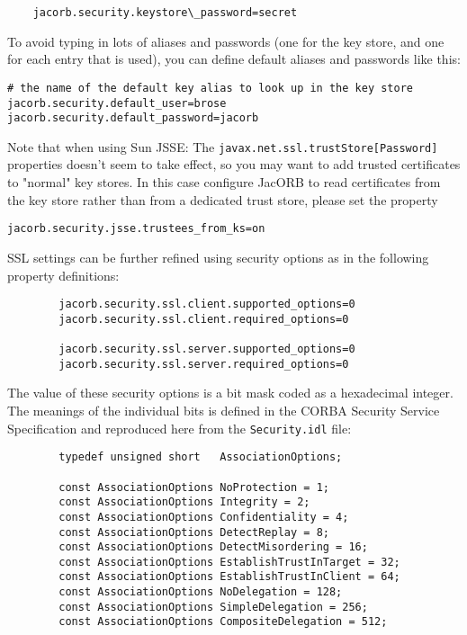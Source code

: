 \begin{verbatim}
    jacorb.security.keystore\_password=secret
\end{verbatim}

To avoid  typing in  lots of  aliases and passwords  (one for  the key
store, and  one for each entry  that is used), you  can define default
aliases and passwords like this:

\begin{verbatim}
# the name of the default key alias to look up in the key store
jacorb.security.default_user=brose
jacorb.security.default_password=jacorb
\end{verbatim}

Note that when using Sun JSSE: The {\tt javax.net.ssl.trustStore[Password]}
properties doesn't seem to take effect, so you may want to add trusted
certificates to "normal" key stores. In this case configure JacORB to read
certificates from the key store rather than from a dedicated trust
store, please set the property
\begin{verbatim}
jacorb.security.jsse.trustees_from_ks=on
\end{verbatim}

SSL settings can be further refined using security options as in
the following property definitions:

\begin{verbatim}
        jacorb.security.ssl.client.supported_options=0
        jacorb.security.ssl.client.required_options=0

        jacorb.security.ssl.server.supported_options=0
        jacorb.security.ssl.server.required_options=0
\end{verbatim}

The  value  of  these security  options  is  a  bit  mask coded  as  a
hexadecimal integer. The meanings of the individual bits is defined in
the CORBA Security Service  Specification and reproduced here from the
{\tt Security.idl} file:

\begin{verbatim}
        typedef unsigned short   AssociationOptions;

        const AssociationOptions NoProtection = 1;
        const AssociationOptions Integrity = 2;
        const AssociationOptions Confidentiality = 4;
        const AssociationOptions DetectReplay = 8;
        const AssociationOptions DetectMisordering = 16;
        const AssociationOptions EstablishTrustInTarget = 32;
        const AssociationOptions EstablishTrustInClient = 64;
        const AssociationOptions NoDelegation = 128;
        const AssociationOptions SimpleDelegation = 256;
        const AssociationOptions CompositeDelegation = 512;
\end{verbatim}


